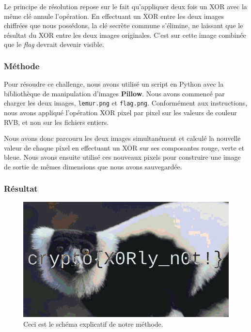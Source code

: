 \documentclass[12pt, a4paper]{article}
\begin{document}
    Le principe de résolution repose sur le fait qu'appliquer deux fois un XOR
    avec la même clé annule l'opération. En effectuant un XOR entre les deux
    images chiffrées que nous possédons, la clé secrète commune s'élimine,
    ne laissant que le résultat du XOR entre les deux images originales. C'est
    sur cette image combinée que le \textit{flag} devrait devenir visible.

    \subsubsection{Méthode}
    Pour résoudre ce challenge, nous avons utilisé un script en Python avec la
    bibliothèque de manipulation d'images \textbf{Pillow}. Nous avons commencé
    par charger les deux images, \texttt{lemur.png} et \texttt{flag.png}.
    Conformément aux instructions, nous avons appliqué l'opération XOR pixel
    par pixel sur les valeurs de couleur RVB, et non sur les fichiers entiers.

    Nous avons donc parcouru les deux images simultanément et calculé la nouvelle
    valeur de chaque pixel en effectuant un XOR sur ses composantes rouge,
    verte et bleue. Nous avons ensuite utilisé ces nouveaux pixels pour
    construire une image de sortie de mêmes dimensions que nous avons sauvegardée.

    \subsubsection{Résultat}
    \begin{figure}[H]
        \centering
        \includegraphics[width=0.8\linewidth]{Images/Lemur/xored_result.png}

        \caption{Ceci est le schéma explicatif de notre méthode.}

        \label{fig:encodeChallRes}
    \end{figure}
\end{document}
